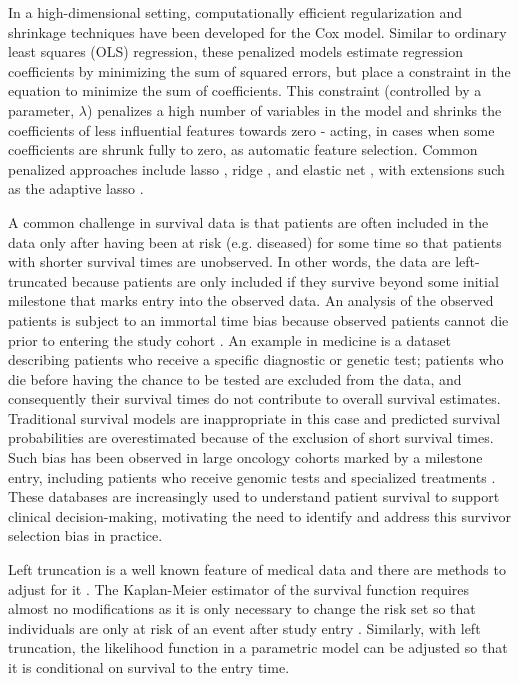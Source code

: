 \documentclass[11pt,final,fleqn]{article}\usepackage[]{graphicx}\usepackage[]{color}
\theoremstyle{plain}
\begin{document}
In a high-dimensional setting, computationally efficient regularization and shrinkage techniques have been developed \cite{tibshirani1997lasso, friedman2010regularization, simon2011regularization} for the Cox model. Similar to ordinary least squares (OLS) regression, these penalized models estimate regression coefficients by minimizing the sum of squared errors, but place a constraint in the equation to minimize the sum of coefficients. This constraint (controlled by a parameter, $\lambda$) penalizes a high number of variables in the model and shrinks the coefficients of less influential features towards zero - acting, in cases when some coefficients are shrunk fully to zero, as automatic feature selection. Common penalized approaches include lasso \cite{tibshirani1996regression}, ridge \cite{hoerl1970ridgeA, hoerl1970ridgeB}, and elastic net \cite{zou2005regularization}, with extensions such as the adaptive lasso \cite{zou2006adaptive}. 

A common challenge in survival data is that patients are often included in the data only after having been at risk (e.g. diseased) for some time so that patients with shorter survival times are unobserved. In other words, the data are left-truncated because patients are only included if they survive beyond some initial milestone that marks entry into the observed data. An analysis of the observed patients is subject to an immortal time bias because observed patients cannot die prior to entering the study cohort \cite{levesque2010problem, giobbie2013challenges}. An example in medicine is a dataset describing patients who receive a specific diagnostic or genetic test; patients who die before having the chance to be tested are excluded from the data, and consequently their survival times do not contribute to overall survival estimates. Traditional survival models are inappropriate in this case and predicted survival probabilities are overestimated because of the exclusion of short survival times. Such bias has been observed in large oncology cohorts marked by a milestone entry, including patients who receive genomic tests \cite{kehl2020selectionbias} and specialized treatments \cite{newman2020immortaltime}. These databases are increasingly used to understand patient survival to support clinical decision-making, motivating the need to identify and address this survivor selection bias in practice. 

Left truncation is a well known feature of medical data and there are methods to adjust for it \cite{kalbfleisch2011statistical}. The Kaplan-Meier estimator of the survival function requires almost no modifications as it is only necessary to change the risk set so that individuals are only at risk of an event after study entry \cite{tsai1987note}. Similarly, with left truncation, the likelihood function in a parametric model can be adjusted so that it is conditional on survival to the entry time.
\end{document}
